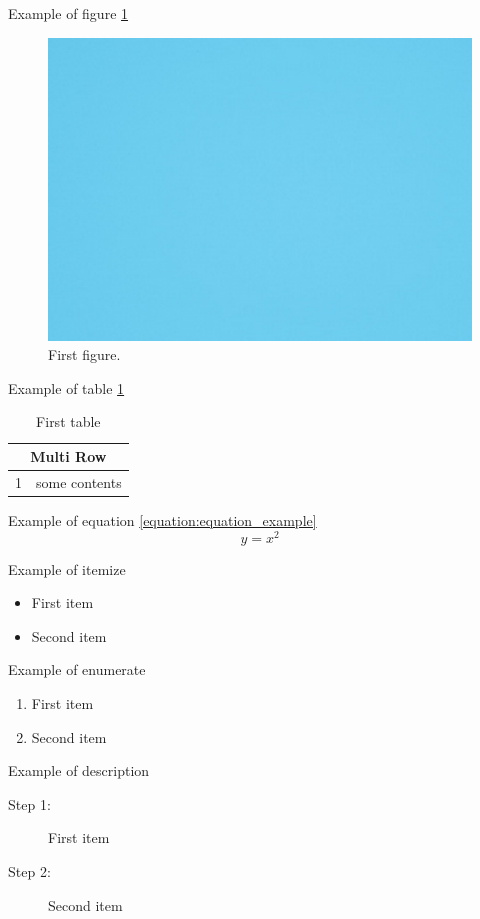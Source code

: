 Example of figure \ref{figure:figure_example}
\begin{figure}[h]
    \centering
    \includegraphics{figures/figures-background.eps}
    \caption{First figure.}
    \label{figure:figure_example}
\end{figure}

Example of table \ref{table:table_example}
\begin{table}[h]
    \caption{First table}
    \label{table:table_example}
    \centering
    \begin{tabular}{|l|l|}
      \hline
      \multicolumn{2}{|c|}{Multi Row}\\
      \hline
      1 &  some contents\\
      \hline
    \end{tabular}
\end{table}

Example of equation \ref{equation:equation_example}
\begin{equation}
    y=x^2
    \label{equation:equation_example}
\end{equation}

Example of itemize
\begin{itemize}
    \item First item
    \item Second item
\end{itemize}

Example of enumerate
\begin{enumerate}
    \item First item
    \item Second item
\end{enumerate}

Example of description
\begin{description}
    \item[Step 1:] First item
    \item[Step 2:] Second item
\end{description}

